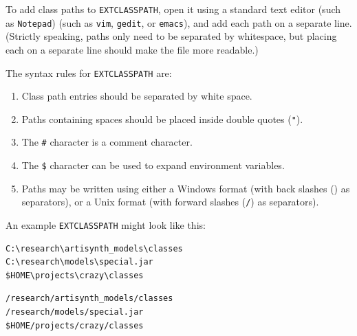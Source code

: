 To add class paths to {\tt EXTCLASSPATH}, open it using a
standard text editor
\ifWindows
(such as {\tt Notepad})
\else
(such as {\tt vim}, {\tt gedit}, or {\tt emacs}),
\fi
and add each path on a separate line. (Strictly speaking, paths only
need to be separated by whitespace, but placing each on a separate
line should make the file more readable.)

The syntax rules for {\tt EXTCLASSPATH} are:

\begin{enumerate}

\item Class path entries should be separated by white space.

\item Paths containing spaces should be placed inside double quotes
({\tt "}).

\item The {\tt \#} character is a comment character.

\item The {\tt \$} character can be used to expand environment variables.

\ifWindows
\item Paths may be written using either a Windows format (with back
slashes ({\tt \BKS}) as separators), or a Unix format (with forward
slashes ({\tt /}) as separators).
\fi

\end{enumerate}

An example {\tt EXTCLASSPATH} might look like this:

\ifWindows
\begin{verbatim}
C:\research\artisynth_models\classes
C:\research\models\special.jar
$HOME\projects\crazy\classes
\end{verbatim}
\else
\begin{verbatim}
/research/artisynth_models/classes
/research/models/special.jar
$HOME/projects/crazy/classes
\end{verbatim}
\fi




